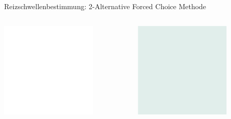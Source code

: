 \documentclass[aspectratio=169]{beamer}
\begin{document}
\begin{frame}{Reizschwellenbestimmung: 2-Alternative Forced Choice Methode}
\begin{columns}[c]
\begin{column}{1cm}
\includegraphics[width=\textwidth]{reizschwelle_seriell_1.png}
\end{column}
\begin{column}{1cm}
\includegraphics[width=\textwidth]{reizschwelle_AFC_2.png}
\end{column}

\end{columns}



    
\end{frame}
\end{document}
